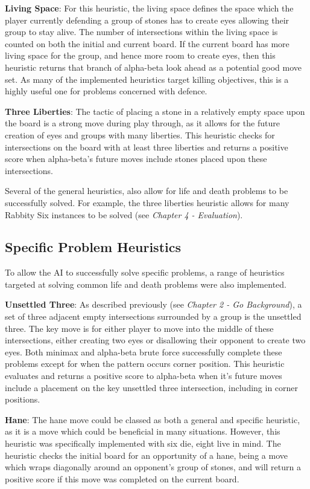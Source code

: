 \documentclass{l3proj}
\begin{document}
\textbf{Living Space}: For this heuristic, the living space defines the space which the player currently defending a group of stones has to create eyes allowing their group to stay alive. The number of intersections within the living space is counted on both the initial and current board. If the current board has more living space for the group, and hence more room to create eyes, then this heuristic returns that branch of alpha-beta look ahead as a potential good move set. As many of the implemented heuristics target killing objectives, this is a highly useful one for problems concerned with defence.

\textbf{Three Liberties}: The tactic of placing a stone in a relatively empty space upon the board is a strong move during play through, as it allows for the future creation of eyes and groups with many liberties. This heuristic checks for intersections on the board with at least three liberties and returns a positive score when alpha-beta's future moves include stones placed upon these intersections.

Several of the general heuristics, also allow for life and death problems to be successfully solved. For example, the three liberties heuristic allows for many Rabbity Six instances to be solved (see \textit{Chapter 4 - Evaluation}).

\subsection{Specific Problem Heuristics}

To allow the AI to successfully solve specific problems, a range of heuristics targeted at solving common life and death problems were also implemented.

\textbf{Unsettled Three}: As described previously (see \textit{Chapter 2 - Go Background}), a set of three adjacent empty intersections surrounded by a group is the unsettled three. The key move is for either player to move into the middle of these intersections, either creating two eyes or disallowing their opponent to create two eyes. Both minimax and alpha-beta brute force successfully complete these problems except for when the pattern occurs corner position. This heuristic evaluates and returns a positive score to alpha-beta when it's future moves include a placement on the key unsettled three intersection, including in corner positions.

\textbf{Hane}: The hane move could be classed as both a general and specific heuristic, as it is a move which could be beneficial in many situations. However, this heuristic was specifically implemented with six die, eight live in mind. The heuristic checks the initial board for an opportunity of a hane, being a move which wraps diagonally around an opponent's group of stones, and will return a positive score if this move was completed on the current board.
\end{document}
